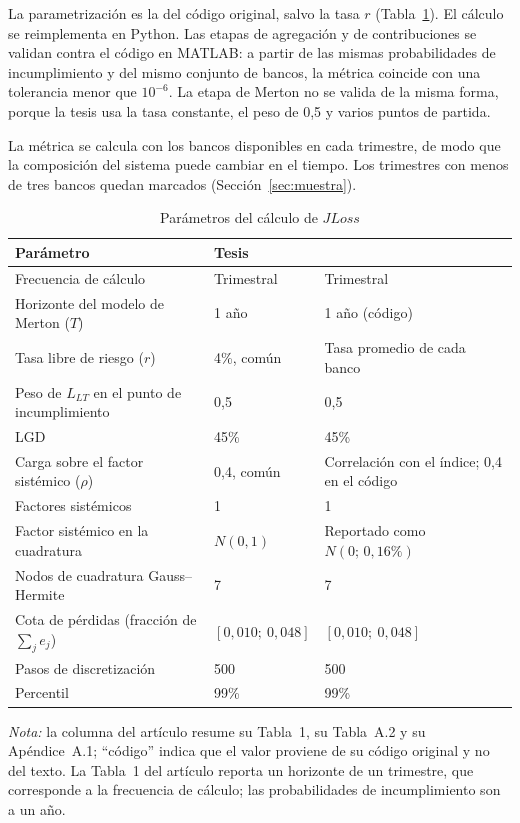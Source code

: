 La parametrización es la del código original, salvo la tasa $r$ (Tabla~\ref{tab:params}). El cálculo se reimplementa en Python. Las etapas de agregación y de contribuciones se validan contra el código en MATLAB: a partir de las mismas probabilidades de incumplimiento y del mismo conjunto de bancos, la métrica coincide con una tolerancia menor que $10^{-6}$. La etapa de Merton no se valida de la misma forma, porque la tesis usa la tasa constante, el peso de 0,5 y varios puntos de partida.

La métrica se calcula con los bancos disponibles en cada trimestre, de modo que la composición del sistema puede cambiar en el tiempo. Los trimestres con menos de tres bancos quedan marcados (Sección~\ref{sec:muestra}).

\begin{table}[htbp]
\centering
\small
\caption{Parámetros del cálculo de $JLoss$}
\label{tab:params}
\begin{tabular}{lll}
\toprule
Parámetro & Tesis & \citet{Chari2024b} \\
\midrule
Frecuencia de cálculo & Trimestral & Trimestral \\
Horizonte del modelo de Merton ($T$) & 1 año & 1 año (código) \\
Tasa libre de riesgo ($r$) & 4\%, común & Tasa promedio de cada banco \\
Peso de $L_{LT}$ en el punto de incumplimiento & 0,5 & 0,5 \\
LGD & 45\% & 45\% \\
Carga sobre el factor sistémico ($\rho$) & 0,4, común & Correlación con el índice; 0,4 en el código \\
Factores sistémicos & 1 & 1 \\
Factor sistémico en la cuadratura & $N(0,1)$ & Reportado como $N(0;\,0{,}16\%)$ \\
Nodos de cuadratura Gauss--Hermite & 7 & 7 \\
Cota de pérdidas (fracción de $\sum_j e_j$) & $[0{,}010;\ 0{,}048]$ & $[0{,}010;\ 0{,}048]$ \\
Pasos de discretización & 500 & 500 \\
Percentil & 99\% & 99\% \\
\bottomrule
\end{tabular}
\par\smallskip
\begin{minipage}{0.92\linewidth}\footnotesize
\textit{Nota:} la columna del artículo resume su Tabla~1, su Tabla~A.2 y su Apéndice~A.1; ``código'' indica que el valor proviene de su código original y no del texto. La Tabla~1 del artículo reporta un horizonte de un trimestre, que corresponde a la frecuencia de cálculo; las probabilidades de incumplimiento son a un año.
\end{minipage}
\end{table}

